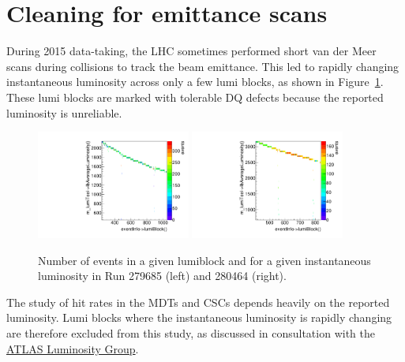\section{Cleaning for emittance scans}
\label{sec:emittance}

During 2015 data-taking, the LHC sometimes performed short van der Meer scans during collisions to track the beam emittance. This led to rapidly changing instantaneous luminosity across only a few lumi blocks, as shown in Figure~\ref{fig:emittance-scans}. These lumi blocks are marked with tolerable DQ defects because the reported luminosity is unreliable.

\begin{figure}
  \begin{center}
    \includegraphics[width=0.45\textwidth]{./figures/lumi_vs_lb_00279685.pdf}
    \includegraphics[width=0.45\textwidth]{./figures/lumi_vs_lb_00280464.pdf}
    \caption{Number of events in a given lumiblock and for a given instantaneous luminosity in Run 279685 (left) and 280464 (right). }
    \label{fig:emittance-scans}
  \end{center}
\end{figure}

The study of hit rates in the MDTs and CSCs depends heavily on the reported luminosity. Lumi blocks where the instantaneous luminosity is rapidly changing are therefore excluded from this study, as discussed in consultation with the \href{http://cern.ch/go/t7ND}{ATLAS Luminosity Group}.

